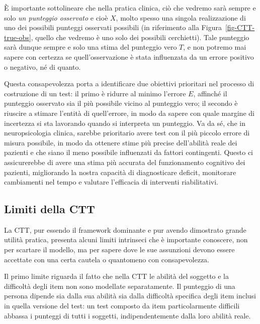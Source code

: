 \documentclass[
  italian,
  letterpaper,
  paper=A4,
  headinclude=on,
  footinclude=on,
  12pt]{scrbook}
\begin{document}
È importante sottolineare che nella pratica clinica, ciò che vedremo
sarà sempre e solo \emph{un punteggio osservato} e cioè \(X\), molto
spesso una singola realizzazione di uno dei possibili punteggi osservati
possibili (in riferimento alla Figura~\ref{fig-CTT-true-obs}, quello che
vedremo è uno solo dei possibili cerchietti). Tale punteggio sarà dunque
sempre e solo una stima del punteggio vero \(T\), e non potremo mai
sapere con certezza se quell'osservazione è stata influenzata da un
errore positivo o negativo, né di quanto.

Questa consapevolezza porta a identificare due obiettivi prioritari nel
processo di costruzione di un test: il primo è ridurre al minimo
l'errore \(E\), affinché il punteggio osservato sia il più possibile
vicino al punteggio vero; il secondo è riuscire a stimare l'entità di
quell'errore, in modo da sapere con quale margine di incertezza si sta
lavorando quando si interpreta un punteggio. Va da sé, che in
neuropsicologia clinica, sarebbe prioritario avere test con il più
piccolo errore di misura possibile, in modo da ottenere stime più
precise dell'abilità reale dei pazienti e che siano il meno possibile
influenzati da fattori contingenti. Questo ci assicurerebbe di avere una
stima più accurata del funzionamento cognitivo dei pazienti, migliorando
la nostra capacità di diagnosticare deficit, monitorare cambiamenti nel
tempo e valutare l'efficacia di interventi riabilitativi.

\subsection{Limiti della CTT}\label{limiti-della-ctt}

La CTT, pur essendo il framework dominante e pur avendo dimostrato
grande utilità pratica, presenta alcuni limiti intrinseci che è
importante conoscere, non per scartare il modello, ma per sapere dove le
sue assunzioni devono essere accettate con una certa cautela o
quantomeno con consapevolezza.

Il primo limite riguarda il fatto che nella CTT le abilità del soggetto
e la difficoltà degli item non sono modellate separatamente. Il
punteggio di una persona dipende sia dalla sua abilità sia dalla
difficoltà specifica degli item inclusi in quella versione del test: un
test composto da item particolarmente difficili abbassa i punteggi di
tutti i soggetti, indipendentemente dalla loro abilità reale.
\end{document}
